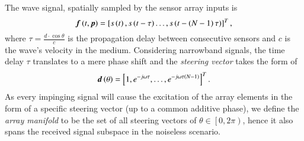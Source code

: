 The wave signal, spatially sampled by the sensor array inputs is
\begin{equation}
\label{eq_prlm_timeSpace_outputVec}
\boldsymbol{f}\left({t,\boldsymbol{p}}\right) = \left[{s\left({t}\right),s\left({t-\tau}\right)\dots, s\left({t-\left({N-1}\right)\tau}\right)}\right]^{T},
\end{equation}
where $\tau = \frac{d\cdot{}\cos{\theta}}{c}$ is the propagation delay between consecutive sensors and $c$ is the wave's velocity in the medium.
Considering narrowband signals, the time delay $\tau$ translates to a mere phase shift and the \emph{steering vector} takes the form of
\begin{equation}
\boldsymbol{d}\left({\theta}\right)=\left[{1,e^{-j\omega\tau},\dots,e^{-j\omega\tau\left({N-1}\right)}}\right]^{T}.
\end{equation}
As every impinging signal will cause the excitation of the array elements in the form of a specific steering vector (up to a common additive phase), we define the \emph{array manifold} to be the set of all steering vectors of $\theta\in\left[0,2\pi\right)$, hence it also spans the received signal subspace in the noiseless scenario.